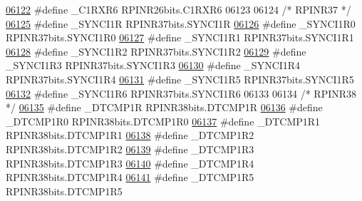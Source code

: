 \begin{DoxyCode}
\hypertarget{a00015_source_l06122}{}\hyperlink{a00015_a4cd0a47a78c917733ea2e97f0e0a6bfa}{06122} \textcolor{preprocessor}{#define \_C1RXR6 RPINR26bits.C1RXR6}
06123 
06124 \textcolor{comment}{/* RPINR37 */}
\hypertarget{a00015_source_l06125}{}\hyperlink{a00015_afe32a37a626f276f6e23e90cde184694}{06125} \textcolor{preprocessor}{#define \_SYNCI1R RPINR37bits.SYNCI1R}
\hypertarget{a00015_source_l06126}{}\hyperlink{a00015_a3ce07046f4b59ed5f86a23f689589dea}{06126} \textcolor{preprocessor}{#define \_SYNCI1R0 RPINR37bits.SYNCI1R0}
\hypertarget{a00015_source_l06127}{}\hyperlink{a00015_a6604ecdf70baa2f764ef29d5ece374b0}{06127} \textcolor{preprocessor}{#define \_SYNCI1R1 RPINR37bits.SYNCI1R1}
\hypertarget{a00015_source_l06128}{}\hyperlink{a00015_a83666848783b0acb4020d4ef18c70cfa}{06128} \textcolor{preprocessor}{#define \_SYNCI1R2 RPINR37bits.SYNCI1R2}
\hypertarget{a00015_source_l06129}{}\hyperlink{a00015_aef4ba5b38e330473e0f3656107518e26}{06129} \textcolor{preprocessor}{#define \_SYNCI1R3 RPINR37bits.SYNCI1R3}
\hypertarget{a00015_source_l06130}{}\hyperlink{a00015_a5a127d957bb04aa0e37b822bb0a83341}{06130} \textcolor{preprocessor}{#define \_SYNCI1R4 RPINR37bits.SYNCI1R4}
\hypertarget{a00015_source_l06131}{}\hyperlink{a00015_ae92c7c035a1f9696f3d6a261c5f8b516}{06131} \textcolor{preprocessor}{#define \_SYNCI1R5 RPINR37bits.SYNCI1R5}
\hypertarget{a00015_source_l06132}{}\hyperlink{a00015_aba0776a7058bfc81401ce53db4354258}{06132} \textcolor{preprocessor}{#define \_SYNCI1R6 RPINR37bits.SYNCI1R6}
06133 
06134 \textcolor{comment}{/* RPINR38 */}
\hypertarget{a00015_source_l06135}{}\hyperlink{a00015_a428a27714a683b80d197c124ec452e71}{06135} \textcolor{preprocessor}{#define \_DTCMP1R RPINR38bits.DTCMP1R}
\hypertarget{a00015_source_l06136}{}\hyperlink{a00015_aaf08a4d30760c884edf002a7e8a27a2b}{06136} \textcolor{preprocessor}{#define \_DTCMP1R0 RPINR38bits.DTCMP1R0}
\hypertarget{a00015_source_l06137}{}\hyperlink{a00015_afcfef3f8922acaef541295ab5ac46a97}{06137} \textcolor{preprocessor}{#define \_DTCMP1R1 RPINR38bits.DTCMP1R1}
\hypertarget{a00015_source_l06138}{}\hyperlink{a00015_a41aa59af1cfa926a774ce536cb71d067}{06138} \textcolor{preprocessor}{#define \_DTCMP1R2 RPINR38bits.DTCMP1R2}
\hypertarget{a00015_source_l06139}{}\hyperlink{a00015_ac0340b6b43f7a38fd03f29a60eb9a98c}{06139} \textcolor{preprocessor}{#define \_DTCMP1R3 RPINR38bits.DTCMP1R3}
\hypertarget{a00015_source_l06140}{}\hyperlink{a00015_a0d9e6217b3701a3d92c688adf4b71144}{06140} \textcolor{preprocessor}{#define \_DTCMP1R4 RPINR38bits.DTCMP1R4}
\hypertarget{a00015_source_l06141}{}\hyperlink{a00015_aaf10c3fbae4e5ebcba86bd7df69307a9}{06141} \textcolor{preprocessor}{#define \_DTCMP1R5 RPINR38bits.DTCMP1R5}

\end{DoxyCode}
